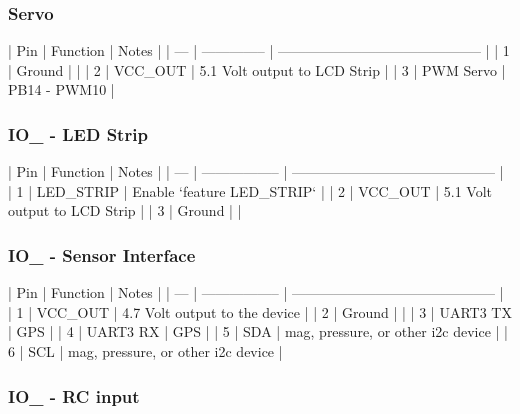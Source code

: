 \subsubsection*{Servo}

\begin{DoxyVerb}| Pin | Function       | Notes                                        |
| --- | -------------- | -------------------------------------------- |
| 1   | Ground         |                                              |
| 2   | VCC_OUT        | 5.1 Volt output to LCD Strip                 |
| 3   | PWM Servo      | PB14 - PWM10                                 |
\end{DoxyVerb}


\subsubsection*{I\+O\+\_ -\/ L\+E\+D Strip}

\begin{DoxyVerb}| Pin | Function          | Notes                                        |
| --- | ----------------- | -------------------------------------------- |
| 1   | LED_STRIP         | Enable `feature LED_STRIP`                   |
| 2   | VCC_OUT           | 5.1 Volt output to LCD Strip                 |
| 3   | Ground            |                                              |
\end{DoxyVerb}


\subsubsection*{I\+O\+\_ -\/ Sensor Interface}

\begin{DoxyVerb}| Pin | Function          | Notes                                        |
| --- | ----------------- | -------------------------------------------- |
| 1   | VCC_OUT           | 4.7 Volt output to the device                |
| 2   | Ground            |                                              |
| 3   | UART3 TX          | GPS                                          |
| 4   | UART3 RX          | GPS                                          |
| 5   | SDA               | mag, pressure, or other i2c device           |
| 6   | SCL               | mag, pressure, or other i2c device           |
\end{DoxyVerb}


\subsubsection*{I\+O\+\_ -\/ R\+C input}

